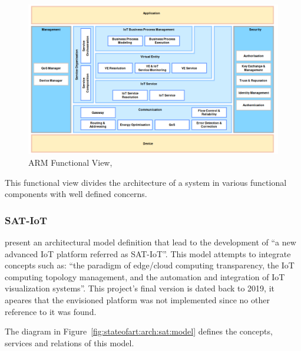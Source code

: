 \begin{figure}[H]
    \centering
    \includegraphics[scale=0.5]{
        assets/figures/arm-functional-view.png
    }
    \caption[ARM Functional View]{ARM Functional View, \cite{iot-arm-functional}}
    \label{fig:stateofart:arch:iota:functional}
\end{figure}

This functional view divides the architecture of a system in various functional components with well defined concerns.

\subsubsection{SAT-IoT}
\label{subsubsec:stateofart:arch:sat}

\cite{8767282} present an architectural model definition that lead to the development of ``a new advanced \gls{IoT} platform referred as SAT-IoT''. This model attempts to integrate concepts such as:  ``the paradigm of edge/cloud computing transparency, the IoT computing topology management, and the automation and integration of IoT visualization systems''. This project's final version is dated back to 2019, it apeares that the envisioned platform was not implemented since no other reference to it was found.

The diagram in Figure~\ref{fig:stateofart:arch:sat:model} defines the concepts, services and relations of this model.

